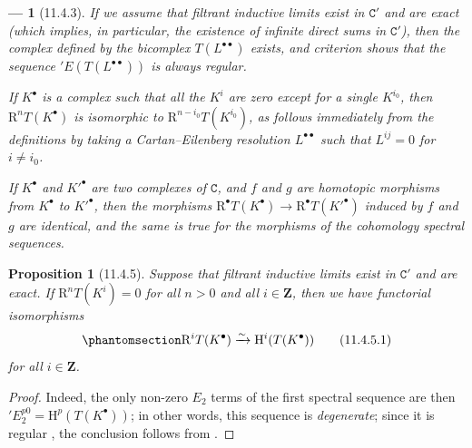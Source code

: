\documentclass[oneside]{amsart}
\theoremstyle{ega-env-style}
\newtheorem*{env}{---}
\theoremstyle{ega-thm-env-style}
\newtheorem*{proposition}{Proposition}
\theoremstyle{ega-defn-env-style}
\def\bb{\mathbf}                    %
\def\cat{\mathtt}                   %
\def\HH{\mathrm{H}}                 %
\def\RR{\mathrm{R}}                 %
\def\simto{\xrightarrow{\sim}}
\let\EGAOriginalLabel\label
\renewcommand{\label}[1]{\phantomsection\EGAOriginalLabel{#1}}
\begin{document}
\begin{env}[11.4.3]
If we assume that filtrant inductive limits exist in $\cat{C}'$ and are exact (which implies, in particular, the existence of infinite direct sums in $\cat{C}'$), then the complex defined by the bicomplex $T(L^{\bullet\bullet})$ exists, and criterion  shows that the sequence $'E(T(L^{\bullet\bullet}))$ is always \emph{regular}.

If $K^\bullet$ is a complex such that all the $K^i$ are zero except for a single $K^{i_0}$, then
$\RR^n T(K^\bullet)$ is isomorphic to $\RR^{n-i_0} T(K^{i_0})$, as follows immediately from the definitions by taking a Cartan--Eilenberg resolution $L^{\bullet\bullet}$ such that $L^{ij}=0$ for $i\neq i_0$.

If $K^\bullet$ and $K'^\bullet$ are two complexes of $\cat{C}$, and $f$ and $g$ are homotopic morphisms from $K^\bullet$ to $K'^\bullet$, then the morphisms $\RR^\bullet T(K^\bullet) \rightarrow \RR^\bullet T(K'^\bullet)$ induced by $f$ and $g$ are identical, and the same is true for the morphisms of the cohomology spectral sequences.
\end{env}

\begin{proposition}[11.4.5]
\label{0.11.4.5}
Suppose that filtrant inductive limits exist in $\cat{C}'$ and are exact.
If $\RR^n T(K^i) = 0$ for all $n>0$ and all $i\in\bb{Z}$, then we have functorial isomorphisms
\[
\label{0.11.4.5.1}
  \RR^i T(K^\bullet) \simto \HH^i(T(K^\bullet))
\tag{11.4.5.1}
\]
for all $i\in\bb{Z}$.
\end{proposition}

\begin{proof}
Indeed, the only non-zero $E_2$ terms of the first spectral sequence  are then $'E_2^{p0} = \HH^p(T(K^\bullet))$;
in other words, this sequence is \emph{degenerate};
since it is regular , the conclusion follows from .
\end{proof}
\end{document}
